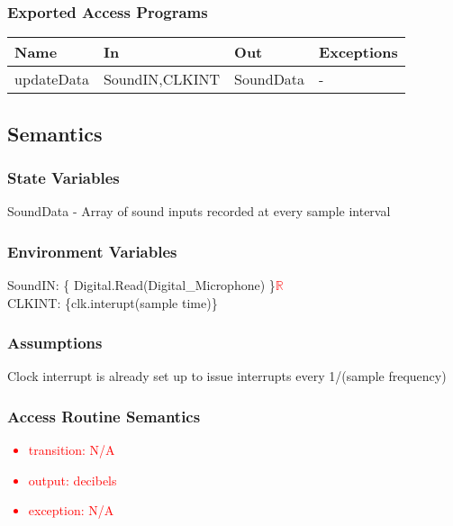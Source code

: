 \documentclass[12pt, titlepage]{article}
\begin{document}
\subsubsection{Exported Access Programs}

\begin{center}
\begin{tabular}{p{2cm} p{4cm} p{4cm} p{2cm}}
\hline
\textbf{Name} & \textbf{In} & \textbf{Out} & \textbf{Exceptions} \\
\hline
updateData & SoundIN,CLKINT & SoundData & - \\
\hline
\end{tabular}
\end{center}

\subsection{Semantics}

\subsubsection{State Variables}

SoundData - Array of sound inputs recorded at every sample interval

\subsubsection{Environment Variables}

SoundIN: \{ Digital.Read(Digital\_Microphone) \}\textcolor{red}{$\mathbb{R}$}\\
CLKINT: \{clk.interupt(sample time)\}

\subsubsection{Assumptions}

Clock interrupt is already set up to issue interrupts every 1/(sample frequency) 

\subsubsection{Access Routine Semantics}
\textcolor{red}{
\begin{itemize}
\item transition: N/A 
\item output: decibels
\item exception: N/A
\end{itemize}
}
\newpage 
\end{document}
